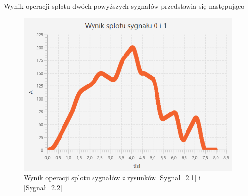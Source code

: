 \documentclass[12pt]{article}
\begin{document}
Wynik operacji splotu dwóch powyższych sygnałów przedstawia się następująco
\begin{figure}[H]
    \centering
	\includegraphics[width=\linewidth]{splot_2.1.png}
    \caption{Wynik operacji splotu sygnałów z rysunków \ref{Sygnał_2.1} i \ref{Sygnał_2.2}}
    \label{Wynik_2.1}
\end{figure}


\end{document}
